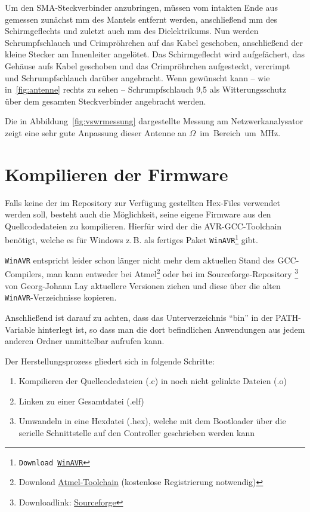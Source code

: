 \documentclass[pdftex, parskip, numbers=noenddot, toc=listof]{scrbook}
\begin{document}
			Um den SMA-Steckverbinder anzubringen, müssen vom intakten Ende aus gemessen zunächst \unit[12]{mm} des Mantels entfernt werden, anschließend \unit[8]{mm} des Schirmgeflechts und zuletzt auch \unit[4]{mm} des Dielektrikums. Nun werden Schrumpfschlauch und Crimpröhrchen auf das Kabel geschoben, anschließend der kleine Stecker am Innenleiter angelötet. Das Schirmgeflecht wird aufgefächert, das Gehäuse aufs Kabel geschoben und das Crimpröhrchen aufgesteckt, vercrimpt und Schrumpfschlauch darüber angebracht. Wenn gewünscht kann -- wie in~\ref{fig:antenne} rechts zu sehen -- Schrumpfschlauch 9{,}5 als Witterungsschutz über dem gesamten Steckverbinder angebracht werden.

			Die in Abbildung~\ref{fig:vswrmessung} dargestellte Messung am Netzwerkanalysator zeigt eine sehr gute Anpassung dieser Antenne an \unit[50]{$\Omega$} im Bereich um \unit[868]{MHz}.



		\section{Kompilieren der Firmware}

			Falls keine der im Repository zur Verfügung gestellten Hex-Files verwendet werden soll, besteht auch die Möglichkeit, seine eigene Firmware aus den Quellcodedateien zu kompilieren. Hierfür wird der die AVR-GCC-Toolchain benötigt, welche es für Windows z.\,B. als fertiges Paket \texttt{WinAVR\footnote{Download \href{http://sourceforge.net/projects/winavr/files/}{WinAVR}}} gibt.

			\texttt{WinAVR} entspricht leider schon länger nicht mehr dem aktuellen Stand des GCC-Compilers, man kann entweder bei Atmel\footnote{Download \href{http://www.atmel.com/tools/ATMELAVRTOOLCHAINFORWINDOWS.aspx}{Atmel-Toolchain} (kostenlose Registrierung notwendig)} oder bei im Sourceforge-Repository%
			\footnote{Downloadlink: \href{http://sourceforge.net/projects/mobilechessboar/files}{Sourceforge}} von Georg-Johann Lay aktuellere Versionen ziehen und diese über die alten \texttt{WinAVR}-Verzeichnisse kopieren.

			Anschließend ist darauf zu achten, dass das Unterverzeichnis \enquote{bin} in der PATH-Variable hinterlegt ist, so dass man die dort befindlichen Anwendungen aus jedem anderen Ordner unmittelbar aufrufen kann.

			Der Herstellungsprozess gliedert sich in folgende Schritte:
			\begin{enumerate}
				\item Kompilieren der Quellcodedateien (.c) in noch nicht gelinkte Dateien (.o)
				\item Linken zu einer Gesamtdatei (.elf)
				\item Umwandeln in eine Hexdatei (.hex), welche mit dem Bootloader über die serielle Schnittstelle auf den Controller geschrieben werden kann
			\end{enumerate}
\end{document}
